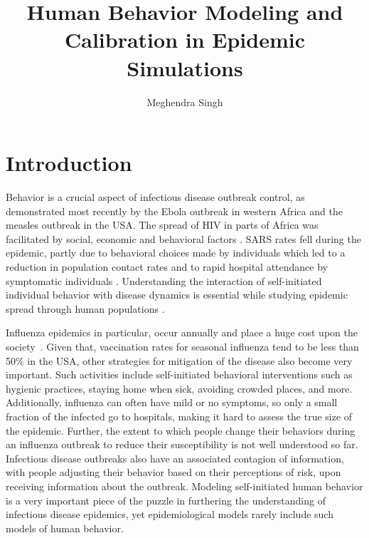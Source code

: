 \documentclass[doublespace]{VTthesis}
\title{Human Behavior Modeling and Calibration in Epidemic Simulations}
\author{Meghendra Singh}
\begin{document}
  \frontmatter
  \maketitle
  \tableofcontents

	\listoffigures
	\listoftables

	\mainmatter

	\chapter{Introduction} \label{ch:introduction}
	Behavior is a crucial aspect of infectious disease outbreak control, as demonstrated most recently by the Ebola outbreak in western Africa and the measles outbreak in the USA. The spread of HIV in parts of Africa was facilitated by social, economic and behavioral factors \cite{ezzell2000care}. SARS rates fell during the epidemic, partly due to behavioral choices made by individuals which led to a reduction in population contact rates and to rapid hospital attendance by symptomatic individuals \cite{riley2003transmission}. Understanding the interaction of self-initiated individual behavior with disease dynamics is essential while studying epidemic spread through human populations \cite{ferguson2007capturing}. 

    Influenza epidemics in particular, occur annually and place a huge cost upon the society~\cite{meltzer99economic}. Given that, vaccination rates for seasonal influenza tend to be less than 50\% in the USA, other strategies for mitigation of the disease also become very important. Such activities include self-initiated behavioral interventions such as hygienic practices, staying home when sick, avoiding crowded places, and more. Additionally, influenza can often have mild or no symptoms, so only a small fraction of the infected go to hospitals, making it hard to assess the true size of the epidemic. Further, the extent to which people change their behaviors during an influenza outbreak to reduce their susceptibility is not well understood so far. Infectious disease outbreaks also have an associated contagion of information, with people adjusting their behavior based on their perceptions of risk, upon receiving information about the outbreak. Modeling self-initiated human behavior is a very important piece of the puzzle in furthering the understanding of infectious disease epidemics, yet epidemiological models rarely include such models of human behavior. 
    
\end{document}
